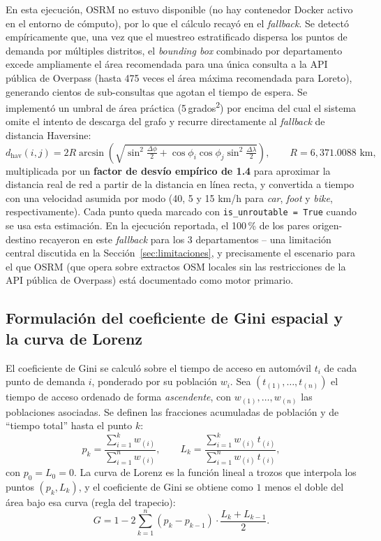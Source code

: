 \documentclass[11pt]{article}
\begin{document}
En esta ejecución, OSRM no estuvo disponible (no hay contenedor Docker
activo en el entorno de cómputo), por lo que el cálculo recayó en el
\textit{fallback}. Se detectó empíricamente que, una vez que el muestreo
estratificado dispersa los puntos de demanda por múltiples distritos, el
\textit{bounding box} combinado por departamento excede ampliamente el área
recomendada para una única consulta a la API pública de Overpass (hasta 475
veces el área máxima recomendada para Loreto), generando cientos de
sub-consultas que agotan el tiempo de espera. Se implementó un umbral de
área práctica (5\,grados\textsuperscript{2}) por encima del cual el sistema
omite el intento de descarga del grafo y recurre directamente al
\textit{fallback} de distancia Haversine:
\[
  d_{\text{hav}}(i,j) = 2 R \arcsin\!\left(\sqrt{\sin^2\!\tfrac{\Delta\phi}{2} + \cos\phi_i \cos\phi_j \sin^2\!\tfrac{\Delta\lambda}{2}}\right),
  \qquad R = 6{,}371.0088\text{ km},
\]
multiplicada por un \textbf{factor de desvío empírico de 1.4} para
aproximar la distancia real de red a partir de la distancia en línea recta,
y convertida a tiempo con una velocidad asumida por modo (40, 5 y 15
km/h para \textit{car}, \textit{foot} y \textit{bike}, respectivamente).
Cada punto queda marcado con \texttt{is\_unroutable = True} cuando se usa
esta estimación. En la ejecución reportada, el 100\,\% de los pares
origen-destino recayeron en este \textit{fallback} para los 3
departamentos -- una limitación central discutida en la
Sección~\ref{sec:limitaciones}, y precisamente el escenario para el que
OSRM (que opera sobre extractos OSM locales sin las restricciones de la
API pública de Overpass) está documentado como motor primario.

\subsection{Formulación del coeficiente de Gini espacial y la curva de Lorenz}
\label{sec:gini-formula}

El coeficiente de Gini se calculó sobre el tiempo de acceso en automóvil
$t_i$ de cada punto de demanda $i$, ponderado por su población $w_i$. Sea
$(t_{(1)}, \dots, t_{(n)})$ el tiempo de acceso ordenado de forma
\emph{ascendente}, con $w_{(1)}, \dots, w_{(n)}$ las poblaciones asociadas.
Se definen las fracciones acumuladas de población y de ``tiempo total''
hasta el punto $k$:
\[
  p_k = \frac{\sum_{i=1}^{k} w_{(i)}}{\sum_{i=1}^{n} w_{(i)}},
  \qquad
  L_k = \frac{\sum_{i=1}^{k} w_{(i)}\, t_{(i)}}{\sum_{i=1}^{n} w_{(i)}\, t_{(i)}},
\]
con $p_0 = L_0 = 0$. La curva de Lorenz es la función lineal a trozos que
interpola los puntos $(p_k, L_k)$, y el coeficiente de Gini se obtiene como
$1$ menos el doble del área bajo esa curva (regla del trapecio):
\[
  G = 1 - 2\sum_{k=1}^{n} (p_k - p_{k-1}) \cdot \frac{L_k + L_{k-1}}{2}.
\]
\end{document}
